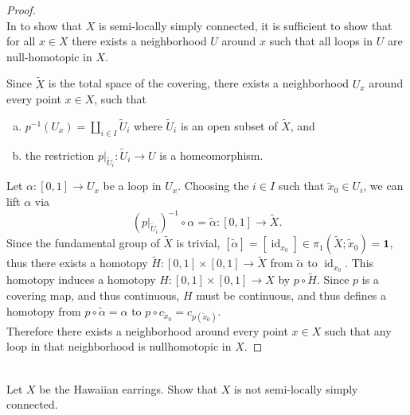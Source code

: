 \documentclass{article}
\newenvironment{problem}[2][Problem]{\begin{trivlist}
\item[\hskip \labelsep {\bfseries #1}\hskip \labelsep {\bfseries #2.}]}{\end{trivlist}}
\begin{document}
\begin{proof} \text{} \\
  In to show that $X$ is semi-locally simply connected, it is sufficient to
  show that for all $x \in X$ there exists a neighborhood $U$ around $x$ such
  that all loops in $U$ are null-homotopic in $X$.

  Since $\widetilde X$ is the total space of the covering, there exists a
  neighborhood $U_x$ around every point $x \in X$, such that
  \begin{enumerate}[a.]
    \item $\displaystyle p^{-1}(U_x) = \coprod_{i \in I} \widetilde U_i$
    where $\widetilde U_i$ is an open subset of $\widetilde X$, and
    \item the restriction
    $p|_{\widetilde U_i}\colon\widetilde U_i \rightarrow U$ is a homeomorphism.
  \end{enumerate}
  Let $\alpha\colon[0, 1]\rightarrow U_x$ be a loop in $U_x$. Choosing the
  $i \in I$ such that $\widetilde x_0 \in U_i$, we can lift $\alpha$ via
  \[
    (p|_{\widetilde U_i})^{-1} \circ \alpha
    = \widetilde\alpha\colon[0,1]\rightarrow \widetilde X.
  \]
  Since the fundamental group of $\widetilde X$ is trivial,
  $[\widetilde\alpha] = [\operatorname{id}_{x_0}] \in \pi_1(\widetilde X; \widetilde x_0) = \mathbf{1}$,
  thus there exists a homotopy
  $\widetilde H\colon [0,1] \times [0, 1] \rightarrow \widetilde X$
  from $\widetilde\alpha$ to $\operatorname{id}_{x_0}$.
  This homotopy induces a homotopy $H\colon [0,1] \times [0, 1] \rightarrow X$
  by $p \circ \widetilde H$. Since $p$ is a covering map, and thus continuous,
  $H$ must be continuous, and thus defines a homotopy from
  $p \circ \widetilde\alpha = \alpha$ to
  $p \circ c_{\widetilde x_0} = c_{p(\widetilde x_0)}$.
  \\
  Therefore there exists a neighborhood around every point $x \in X$ such that
  any loop in that neighborhood is nullhomotopic in $X$.
\end{proof}
\pagebreak
\begin{problem}{3} \text{} \\
  Let $X$ be the Hawaiian earrings. Show that $X$ is not semi-locally simply
  connected.
\end{problem}
\end{document}
